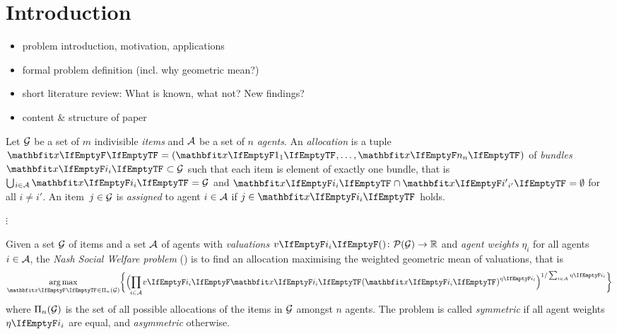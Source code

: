 \section{Introduction}
\label{sec:intro}

\begin{itemize}
	\item
	problem introduction, motivation, applications

	\item
	formal problem definition (incl. why geometric mean?)

	\item
	short literature review: What is known, what not? New findings?

	\item
	content \& structure of paper
\end{itemize}

\begin{definition}
	Let \(\mathcal{G}\) be a set of \(m\) indivisible \emph{items} and \(\mathcal{A}\) be a set of \(n\) \emph{agents}.
	An \emph{allocation} is a tuple \(\alloc[][] = ( \alloc[][1], \dots, \alloc[][n] )\) of \emph{bundles} \(\alloc \subset \goods\) such that each item is element of exactly one bundle, that is \(\mathop{\bigcup\hspace{-1pt}_{i \in \agents}} \alloc = \goods\) and \(\alloc \cap \alloc[][i'] = \emptyset\) for all \(i \neq i'\).
	An item~\(j \in \mathcal{G}\) is \emph{assigned} to agent \(i \in \mathcal{A}\) if \(j \in \alloc\) holds.
\end{definition}

\(\vdots\)

\begin{definition}
	Given a set \(\mathcal{G}\) of items and a set \(\mathcal{A}\) of agents with \emph{valuations} \(\valuations \colon \powerset[\goods] \to \real\) and \emph{agent weights} \(\eta_i\) for all agents \(i \in \mathcal{A}\), the \emph{Nash Social Welfare problem} (\NSW) is to find an allocation maximising the weighted geometric mean of valuations, that is
	\begin{equation*}
		\argmax_{\alloc[][] \in \allallocs{n}{\goods}} \braces[\bigg]{ \paren[\Big]{ \smashoperator{\prod_{i \in \agents}} \valuations[\alloc]^{\weight} }^{1 / \sum_{i \in \agents} \weight} }
	\end{equation*}
	where \(\Pi_{n}(\mathcal{G})\) is the set of all possible allocations of the items in \(\mathcal{G}\) amongst \(n\) agents.
	The problem is called \emph{symmetric} if all agent weights \(\weight\) are equal, and \emph{asymmetric} otherwise.
\end{definition}

